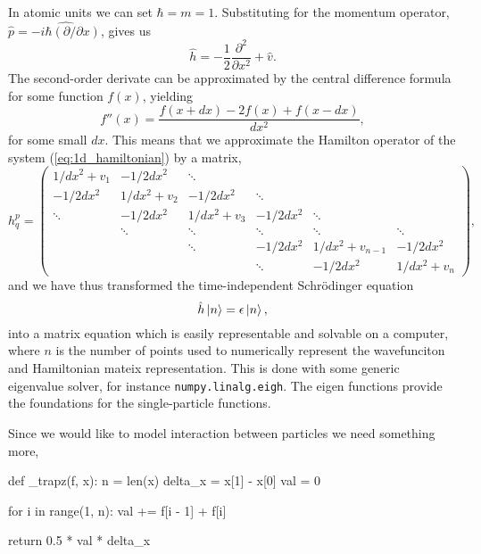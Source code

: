 In atomic units we can set $\hbar = m = 1$. Substituting for the 
momentum operator, $\hat{p} = \hat{-i\hbar (\partial / \partial x)}$, gives us 
\begin{equation}
    \label{eq:1d_hamiltonian}
    \hat{h} = - \frac{1}{2} \frac{\partial^2}{\partial x^2} + \hat{v}.
\end{equation}
The second-order derivate can be approximated by the central difference 
formula for some function $f(x)$, yielding
\begin{equation}
    f''(x) = \frac{f(x + dx) - 2f(x) +f(x - dx)}{dx^2},
\end{equation}
for some small $dx$. This means that we approximate the Hamilton 
operator of the system (\autoref{eq:1d_hamiltonian}) by a matrix,
\begin{equation}
    h^p_q =  \begin{pmatrix}
    1/dx^2 + v_1 & -1/2dx^2 & \ddots & & & \\
    -1/2dx^2 & 1/dx^2 + v_2 & -1/2dx^2 & \ddots & & \\
    \ddots & -1/2dx^2 & 1/dx^2 + v_3 & -1/2dx^2 & \ddots & \\
    & \ddots & \ddots & \ddots & \ddots & \ddots \\
    & & \ddots & -1/2dx^2 & 1/dx^2 + v_{n-1} & -1/2dx^2 \\
    & & & \ddots & -1/2dx^2 & 1/dx^2 + v_n
    \end{pmatrix},
\end{equation}
and we have thus transformed the time-independent Schrödinger equation
\begin{equation}
    \hat{h} \ket{n} = \epsilon \ket{n},
\end{equation}
into a matrix equation which is easily representable and solvable on a computer, where $n$ is 
the number of points used to numerically represent the wavefunciton 
and Hamiltonian mateix representation. This is done with some generic 
eigenvalue solver, for instance \lstinline{numpy.linalg.eigh}.
The eigen functions provide the foundations for the single-particle functions.

Since we would like to model interaction between particles we need something more,

\begin{python}
def _trapz(f, x):
    n = len(x)
    delta_x = x[1] - x[0]
    val = 0

    for i in range(1, n):
        val += f[i - 1] + f[i]

    return 0.5 * val * delta_x
    
\end{python}


